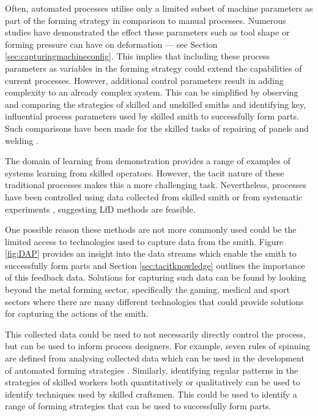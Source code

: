 Often, automated processes utilise only a limited subset of machine parameters as part of the forming strategy in comparison to manual processes. Numerous studies have demonstrated the effect these parameters such as tool shape or forming pressure can have on deformation --- see Section \ref{sec:capturingmachineconfig}. This implies that including these process parameters as variables in the forming strategy could extend the capabilities of current processes. However, additional control parameters result in adding complexity to an already complex system. This can be simplified by observing and comparing the strategies of skilled and unskilled smiths and identifying key, influential process parameters used by skilled smith to successfully form parts. Such comparisons have been made for the skilled tasks of repairing of panels \citep{Ikemoto2016ARepair} and welding \citep{Manorathna2017HumanAutomation}.

The domain of learning from demonstration provides a range of examples of systems learning from skilled operators. However, the tacit nature of these traditional processes makes this a more challenging task. Nevertheless, processes have been controlled using data collected from skilled smith \citep{Ilangovan2016AnForming} or from systematic experiments \citep{Ilangovan2016FixturelessForming,Mori1996DeterminationAlgorithm, Mori1998IncrementalDatabase,Opritescu2012AutomatedStrategy,Opritescu2016VariationVariance,Hartmann2019Knowledge-basedPartitioning,Opritescu2015AutomatedApproach,Hartmann2019AnFree-forming,Rossi2018ModellingWheel, Rossi2018Re/LearningSurfaces,Auer2004ComparisonSpinning,Henkenjohann2005AnProcess,Arai2006Force-controlledMotors}, suggesting LfD methods are feasible.

One possible reason these methods are not more commonly used could be the limited access to technologies used to capture data from the smith.  Figure \ref{fig:DAP} provides an insight into the data streams which enable the smith to successfully form parts and Section \ref{sec:tacitknowledge} outlines the importance of this feedback data. Solutions for capturing such data can be found by looking beyond the metal forming sector, specifically the gaming, medical and sport sectors where there are many different technologies that could provide solutions for capturing the actions of the smith.

This collected data could be used to not necessarily directly control the process, but can be used to inform process designers. For example, seven rules of spinning are defined from analysing collected data which can be used in the development of automated forming strategies \citep{Russo2021SevenSpinning}. Similarly, identifying regular patterns in the strategies of skilled workers both quantitatively \citep{Kalt2016TowardsOperation,Phan2018InstrumentationWorkpiece} or qualitatively \citep{Cutkosky1986ModellingHands,Elkington2015HandProcess} can be used to identify techniques used by skilled craftsmen. This could be used to identify a range of forming strategies that can be used to successfully form parts.


